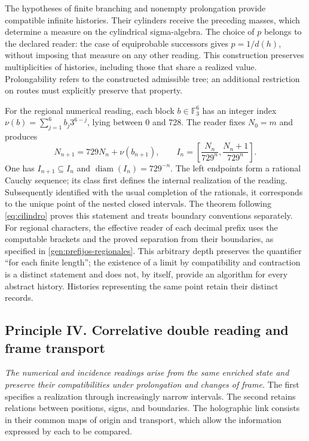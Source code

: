 The hypotheses of finite branching and nonempty prolongation provide
compatible infinite histories. Their cylinders receive the preceding masses,
which determine a measure on the cylindrical sigma-algebra. The choice of
\(p\) belongs to the declared reader: the case of equiprobable successors gives
\(p=1/d(h)\), without imposing that measure on any other reading. This
construction preserves multiplicities of histories, including those that
share a realized value. Prolongability refers to the constructed
admissible tree; an additional restriction on routes must explicitly
preserve that property.

For the regional numerical reading, each block
\(b\in\mathbb F_3^6\) has an integer index
\(\nu(b)=\sum_{j=1}^6 b_j3^{6-j}\), lying between 0 and 728.
The reader fixes \(N_0=m\) and produces
\[
 N_{n+1}=729N_n+\nu(b_{n+1}),\qquad
 I_n=\left[\frac{N_n}{729^n},\frac{N_n+1}{729^n}\right].
\]
One has \(I_{n+1}\subseteq I_n\) and
\(\operatorname{diam}(I_n)=729^{-n}\). The left endpoints form
a rational Cauchy sequence; its class first defines the internal
realization of the reading. Subsequently identified with the usual
completion of the rationals, it corresponds to the unique point of the nested
closed intervals. The theorem following \eqref{eq:cilindro} proves
this statement and treats boundary conventions separately. For
regional characters, the effective reader of each decimal prefix
uses the computable brackets and the proved separation from
their boundaries, as specified in \cref{gen:prefijos-regionales}. This arbitrary
depth preserves the quantifier “for each finite length”; the
existence of a limit by compatibility and contraction is a distinct
statement and does not, by itself, provide an algorithm for every abstract
history. Histories representing the same point retain their
distinct records.

\subsection*{Principle IV. Correlative double reading and frame transport}
\hypertarget{prinh:doble}{}

\emph{The numerical and incidence readings arise from the same enriched
state and preserve their compatibilities under prolongation and changes of
frame.} The first specifies a realization through increasingly
narrow intervals. The second retains relations between positions, signs, and
boundaries. The holographic link consists in their common maps of origin and
transport, which allow the information expressed by each to be compared.

